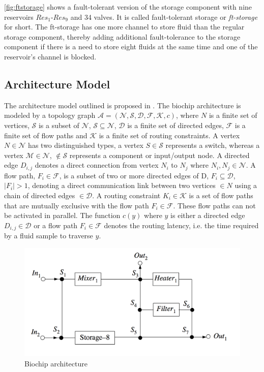 \autoref{fig:ftstorage} shows a fault-tolerant version of the storage component with nine reservoirs $Res_1$-$Res_9$ and 34 valves. It is called fault-tolerant storage or \emph{ft-storage} for short. The ft-storage has one more channel to store fluid than the regular storage component, thereby adding additional fault-tolerance to the storage component if there is a need to store eight fluids at the same time and one of the reservoir's channel is blocked.

\subsection{Architecture Model}
\label{sec:arch-model}
The architecture model outlined is proposed in \cite{wajid}. The biochip architecture is modeled by a topology graph $\mathcal{A} = (\mathcal{N}, \mathcal{S}, \mathcal{D}, \mathcal{F}, \mathcal{K}, c)$, where $N$ is a finite set of vertices, $\mathcal{S}$ is a subset of $\mathcal{N}$, $\mathcal{S} \subseteq \mathcal{N}$, $\mathcal{D}$ is a finite set of directed edges, $\mathcal{F}$ is a finite set of flow paths and $\mathcal{K}$ is a finite set of routing constraints. A vertex $N \in \mathcal{N}$ has two distinguished types, a vertex $S \in \mathcal{S}$ represents a switch, whereas a vertex $\mathcal{M} \in \mathcal{N}$, $\notin \mathcal{S}$ represents a component or input/output node. A directed edge $D_{i, j}$ denotes a direct connection from vertex $N_i$ to $N_j$ where $N_i, N_j \in \mathcal{N}$. A flow path, $F_i \in \mathcal{F}$, is a subset of two or more directed edges of D, $F_i \subseteq \mathcal{D}$, $|F_i| > 1$, denoting a direct communication link between two vertices $\in N$ using a chain of directed edges $\in \mathcal{D}$. A routing constraint $K_i \in \mathcal{K}$ is a set of flow paths that are mutually exclusive with the flow path $F_i \in \mathcal{F}$. These flow paths can not be activated in parallel. The function $c(y)$ where $y$ is either a directed edge $D_{i, j} \in \mathcal{D}$ or a flow path $F_i \in \mathcal{F}$ denotes the routing latency, i.e. the time required by a fluid sample to traverse $y$.

\begin{figure}[H]
\centering
\includegraphics[scale=0.4]{figures/architecture.png}
\caption[Biochip architecture]{Biochip architecture}
\label{fig:architecture}
\end{figure}

